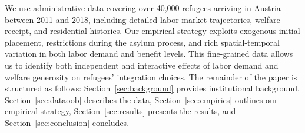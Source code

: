 We use administrative data covering over 40,000 refugees arriving in Austria between 2011 and 2018, including detailed labor market trajectories, welfare receipt, and residential histories. Our empirical strategy exploits exogenous initial placement, restrictions during the asylum process, and rich spatial-temporal variation in both labor demand and benefit levels. This fine-grained data allows us to identify both independent and interactive effects of labor demand and welfare generosity on refugees’ integration choices. The remainder of the paper is structured as follows: Section~\ref{sec:background} provides institutional background, Section~\ref{sec:dataoob} describes the data, Section~\ref{sec:empirics} outlines our empirical strategy, Section~\ref{sec:results} presents the results, and Section~\ref{sec:conclusion} concludes.